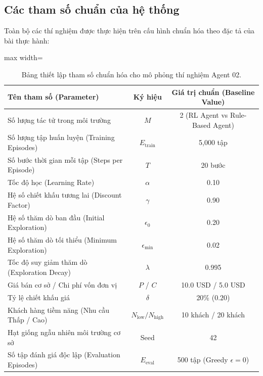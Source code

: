 \documentclass[12pt,a4paper]{article}
\begin{document}
\subsection{Các tham số chuẩn của hệ thống}
Toàn bộ các thí nghiệm được thực hiện trên cấu hình chuẩn hóa theo đặc tả của bài thực hành:
\begin{table}[H]
\centering
\small
\begin{adjustbox}{max width=\linewidth}
\begin{tabular}{lcc}
\toprule
\textbf{Tên tham số (Parameter)} & \textbf{Ký hiệu} & \textbf{Giá trị chuẩn (Baseline Value)} \\
\midrule
Số lượng tác tử trong môi trường & $M$ & 2 (RL Agent vs Rule-Based Agent) \\
Số lượng tập huấn luyện (Training Episodes) & $E_{\text{train}}$ & 5,000 tập \\
Số bước thời gian mỗi tập (Steps per Episode) & $T$ & 20 bước \\
Tốc độ học (Learning Rate) & $\alpha$ & 0.10 \\
Hệ số chiết khấu tương lai (Discount Factor) & $\gamma$ & 0.90 \\
Hệ số thăm dò ban đầu (Initial Exploration) & $\epsilon_0$ & 0.20 \\
Hệ số thăm dò tối thiểu (Minimum Exploration) & $\epsilon_{\min}$ & 0.02 \\
Tốc độ suy giảm thăm dò (Exploration Decay) & $\lambda$ & 0.995 \\
Giá bán cơ sở / Chi phí vốn đơn vị & $P$ / $C$ & 10.0 USD / 5.0 USD \\
Tỷ lệ chiết khấu giá & $\delta$ & 20\% ($0.20$) \\
Khách hàng tiềm năng (Nhu cầu Thấp / Cao) & $N_{\text{low}} / N_{\text{high}}$ & 10 khách / 20 khách \\
Hạt giống ngẫu nhiên môi trường cơ sở & Seed & 42 \\
Số tập đánh giá độc lập (Evaluation Episodes) & $E_{\text{eval}}$ & 500 tập (Greedy $\epsilon=0$) \\
\bottomrule
\end{tabular}
\end{adjustbox}
\caption{Bảng thiết lập tham số chuẩn hóa cho mô phỏng thí nghiệm Agent 02.}
\label{tab:parameters}
\end{table}
\end{document}
